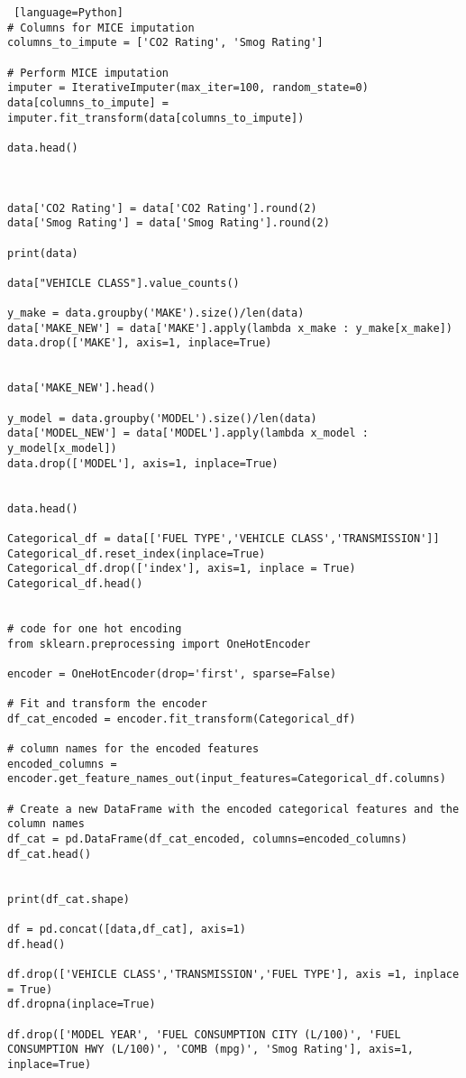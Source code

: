 \documentclass[12pt, a4paper,oneside]{book}
\numberwithin{equation}{section}
\begin{document}
\begin{lstlisting} [language=Python]
# Columns for MICE imputation
columns_to_impute = ['CO2 Rating', 'Smog Rating']

# Perform MICE imputation
imputer = IterativeImputer(max_iter=100, random_state=0)
data[columns_to_impute] = imputer.fit_transform(data[columns_to_impute])

data.head()



data['CO2 Rating'] = data['CO2 Rating'].round(2)
data['Smog Rating'] = data['Smog Rating'].round(2)

print(data)

data["VEHICLE CLASS"].value_counts()

y_make = data.groupby('MAKE').size()/len(data)
data['MAKE_NEW'] = data['MAKE'].apply(lambda x_make : y_make[x_make])
data.drop(['MAKE'], axis=1, inplace=True)


data['MAKE_NEW'].head()

y_model = data.groupby('MODEL').size()/len(data)
data['MODEL_NEW'] = data['MODEL'].apply(lambda x_model : y_model[x_model])
data.drop(['MODEL'], axis=1, inplace=True)


data.head()

Categorical_df = data[['FUEL TYPE','VEHICLE CLASS','TRANSMISSION']]
Categorical_df.reset_index(inplace=True)
Categorical_df.drop(['index'], axis=1, inplace = True)
Categorical_df.head()


# code for one hot encoding 
from sklearn.preprocessing import OneHotEncoder

encoder = OneHotEncoder(drop='first', sparse=False)

# Fit and transform the encoder
df_cat_encoded = encoder.fit_transform(Categorical_df)

# column names for the encoded features
encoded_columns = encoder.get_feature_names_out(input_features=Categorical_df.columns)

# Create a new DataFrame with the encoded categorical features and the column names
df_cat = pd.DataFrame(df_cat_encoded, columns=encoded_columns)
df_cat.head()


print(df_cat.shape)

df = pd.concat([data,df_cat], axis=1)
df.head()

df.drop(['VEHICLE CLASS','TRANSMISSION','FUEL TYPE'], axis =1, inplace = True)
df.dropna(inplace=True)

df.drop(['MODEL YEAR', 'FUEL CONSUMPTION CITY (L/100)', 'FUEL CONSUMPTION HWY (L/100)', 'COMB (mpg)', 'Smog Rating'], axis=1, inplace=True)


\end{lstlisting}
\end{document}
